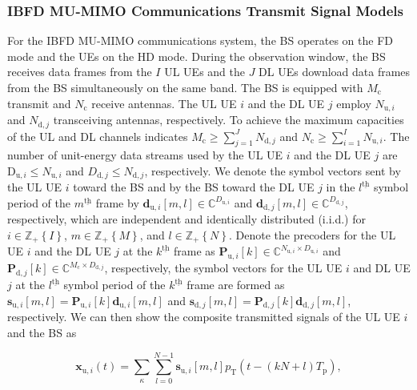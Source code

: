\documentclass[10pt,journal]{IEEEtran}
\newcommand{\paren}[1]{\left({#1}\right)}
\newcommand{\bracket}[1]{{\left [{#1}\right ]}}
\newcommand{\braces}[1]{{\left\{ {#1}\right\}}}
\newcommand{\ith}[1]    {{#1}^{\underline{\text{th}}}}
\newcommand{\cc}{_\mathrm{c}}
\newcommand{\PiB}{\mathbf{P}_{\textrm{u},i}\bracket{k}}
\newcommand{\PBj}{\mathbf{P}_{\textrm{d},j}\bracket{k}}
\theoremstyle{definition}
\begin{document}
\subsubsection{IBFD MU-MIMO Communications Transmit Signal Models}
For the IBFD MU-MIMO communications system, the BS operates on the FD mode and the UEs on the HD mode.  During the observation window, the BS receives data frames from the $I$ UL UEs and the $J$ DL UEs download data frames from the BS simultaneously on the same band. The BS is equipped with $\mathit{M}_\mathrm{c}$ transmit and $\mathit{N}_{\mathrm{c}}$ receive antennas. The UL UE $i$ and the DL UE $j$ employ $\mathit{N}_{\mathrm{u},i}$ and $\mathit{N}_{\mathrm{d},j}$ transceiving antennas, respectively. To achieve the maximum capacities of the UL and DL channels indicates $\mathit{M}\cc\geq\sum_{j=1}^{\mathit{J}}\mathit{N}_{\textrm{d},j}$ and $\mathit{N}\cc\geq\sum_{i=1}^{\mathit{I}}\mathit{N}_{\textrm{u},i}$\cite{tse2005fundamentals}. %
The number of unit-energy data streams used by the UL UE $i$ and the DL UE $j$ are $\mathrm{D}_{\textrm{u},i}\leq \mathit{N}_{\mathrm{u},i}$ and $\mathit{D}_{\mathrm{d},j}\leq \mathit{N}_{\mathrm{d},j}$, respectively. We denote the symbol vectors sent by the UL UE $i$ toward the BS and by the BS toward the DL UE $j$ in the  $\ith{l}$ symbol period of the $\ith{m}$ frame by $\mathbf{d}_{\mathrm{u},i}\bracket{m,l}\in \mathbb{C}^{D_{\textrm{u},i}}$ and $\mathbf{d}_{\mathrm{d},j}\bracket{m,l}\in \mathbb{C}^{\mathit{D}_{\mathrm{d},j}}$, respectively, which are independent and identically distributed (i.i.d.) for $i\in\mathbb{Z}_+\braces{\mathit{I}}$, $m\in\mathbb{Z}_+\braces{\mathit{M}}$, and $l\in\mathbb{Z}_+\braces{\mathit{N}}$. 
Denote the precoders for the UL UE $i$ and the DL UE $j$ at the $\ith{k}$ frame as $\PiB\in\mathbb{C}^{\mathit{N}_{\mathrm{u},i}\times \mathit{D}_{\mathrm{u},i}}$ and $\PBj\in\mathbb{C}^{\mathit{M}\cc\times \mathit{D}_{\mathrm{d},j}}$, respectively, the symbol vectors for the UL UE $i$ and DL UE $j$ at the $\ith{l}$ symbol period of the $\ith{k}$ frame are formed as $\mathbf{s}_{\textrm{u},i}\bracket{m,l}=\PiB\mathbf{d}_{\mathrm{u},i}\bracket{m,l}$ and $\mathbf{s}_{\textrm{d},j}\bracket{m,l}=\PBj\mathbf{d}_{\mathrm{d},j}\bracket{m,l}$, respectively. \color{red}We can then show the composite transmitted signals of the UL UE $i$ and the BS as\par\noindent\small
\begin{equation}
\mathbf{x}_{\mathrm{u},i}\paren{t}=\sum_{\kappa}^{}\sum_{l=0}^{N-1}\mathbf{s}_{\mathrm{u},i}\bracket{m,l}p_{\mathrm{T}}\paren{t-(kN+l)T_{\mathrm{p}}},    
\end{equation}
\end{document}
